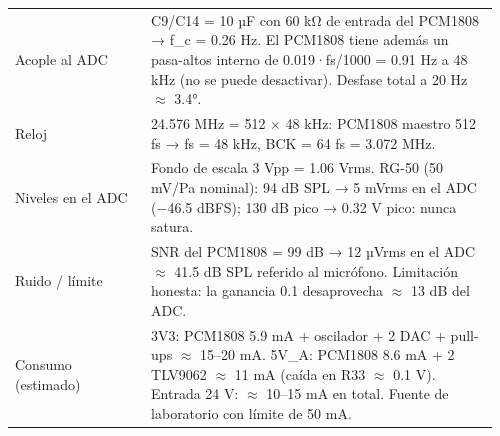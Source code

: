 \documentclass[10pt,a4paper]{article}
\begin{document}
\begin{longtable}{@{}L{0.27\linewidth}L{0.69\linewidth}@{}}
Acople al ADC & C9/C14 = 10 µF con 60 kΩ de entrada del PCM1808 → f\_\allowbreak{}c = 0.26 Hz. El PCM1808 tiene además un pasa-altos interno de 0.019·fs/1000 = 0.91 Hz a 48 kHz (no se puede desactivar). Desfase total a 20 Hz \ensuremath{\approx} 3.4°.\\[2pt]
Reloj & 24.576 MHz = 512 × 48 kHz: PCM1808 maestro 512 fs → fs = 48 kHz, BCK = 64 fs = 3.072 MHz.\\[2pt]
Niveles en el ADC & Fondo de escala 3 Vpp = 1.06 Vrms. RG-50 (50 mV/Pa nominal): 94 dB SPL → 5 mVrms en el ADC (−46.5 dBFS); 130 dB pico → 0.32 V pico: nunca satura.\\[2pt]
Ruido / límite & SNR del PCM1808 = 99 dB → 12 µVrms en el ADC \ensuremath{\approx} 41.5 dB SPL referido al micrófono. Limitación honesta: la ganancia 0.1 desaprovecha \ensuremath{\approx} 13 dB del ADC.\\[2pt]
Consumo (estimado) & 3V3: PCM1808 5.9 mA + oscilador + 2 DAC + pull-ups \ensuremath{\approx} 15–20 mA. 5V\_\allowbreak{}A: PCM1808 8.6 mA + 2 TLV9062 \ensuremath{\approx} 11 mA (caída en R33 \ensuremath{\approx} 0.1 V). Entrada 24 V: \ensuremath{\approx} 10–15 mA en total. Fuente de laboratorio con límite de 50 mA.\\[2pt]
\bottomrule\end{longtable}
\end{document}
